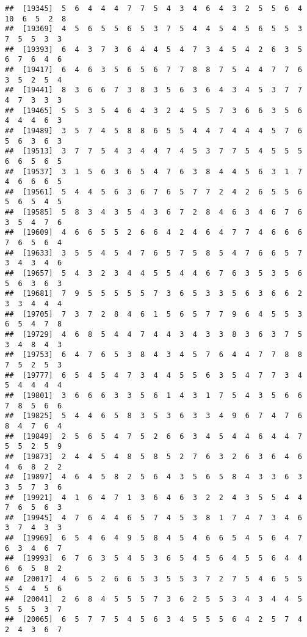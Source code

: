 \documentclass[
]{book}
\begin{document}
\begin{verbatim}
##  [19345]  5  6  4  4  4  7  7  5  4  3  4  6  4  3  2  5  5  6  4 10  6  5  2  8
##  [19369]  4  5  6  5  5  6  5  3  7  5  4  4  5  4  5  6  5  5  3  7  5  5  3  3
##  [19393]  6  4  3  7  3  6  4  4  5  4  7  3  4  5  4  2  6  3  5  6  7  6  4  6
##  [19417]  6  4  6  3  5  6  5  6  7  7  8  8  7  5  4  4  7  7  6  3  5  2  5  4
##  [19441]  8  3  6  6  7  3  8  3  5  6  3  6  4  3  4  5  3  7  7  4  7  3  3  3
##  [19465]  5  5  3  5  4  6  4  3  2  4  5  5  7  3  6  6  3  5  6  4  4  4  6  3
##  [19489]  3  5  7  4  5  8  8  6  5  5  4  4  7  4  4  4  5  7  6  5  6  3  6  3
##  [19513]  3  7  7  5  4  3  4  4  7  4  5  3  7  7  5  4  5  5  5  6  6  5  6  5
##  [19537]  3  1  5  6  3  6  5  4  7  6  3  8  4  4  5  6  3  1  7  4  6  6  6  5
##  [19561]  5  4  4  5  6  3  6  7  6  5  7  7  2  4  2  6  5  5  6  5  6  5  4  5
##  [19585]  5  8  3  4  3  5  4  3  6  7  2  8  4  6  3  4  6  7  6  3  5  4  7  6
##  [19609]  4  6  6  5  5  2  6  6  4  2  4  6  4  7  7  4  6  6  6  7  6  5  6  4
##  [19633]  3  5  5  4  5  4  7  6  5  7  5  8  5  4  7  6  6  5  7  3  4  3  4  6
##  [19657]  5  4  3  2  3  4  4  5  5  4  4  6  7  6  3  5  3  5  6  5  6  3  6  3
##  [19681]  7  9  5  5  5  5  5  7  3  6  5  3  3  5  6  3  6  6  2  3  3  4  4  4
##  [19705]  7  3  7  2  8  4  6  1  5  6  5  7  7  9  6  4  5  5  3  6  5  4  7  8
##  [19729]  4  6  8  5  4  4  7  4  4  3  4  3  3  8  3  6  3  7  5  3  4  8  4  3
##  [19753]  6  4  7  6  5  3  8  4  3  4  5  7  6  4  4  7  7  8  8  7  5  2  5  3
##  [19777]  6  5  4  5  4  7  3  4  4  5  5  6  3  5  4  7  7  3  4  5  4  4  4  4
##  [19801]  3  6  6  6  3  3  5  6  1  4  3  1  7  5  4  3  5  6  6  7  8  5  6  6
##  [19825]  5  4  4  6  5  8  3  5  3  6  3  3  4  9  6  7  4  7  6  8  4  7  6  4
##  [19849]  2  5  6  5  4  7  5  2  6  6  3  4  5  4  4  6  4  4  7  5  5  2  5  9
##  [19873]  2  4  4  5  4  8  5  8  5  2  7  6  3  2  6  3  6  4  6  4  6  8  2  2
##  [19897]  4  6  4  5  8  2  5  6  4  3  5  6  5  8  4  3  3  6  3  3  5  7  3  6
##  [19921]  4  1  6  4  7  1  3  6  4  6  3  2  2  4  3  5  5  4  4  7  6  5  6  3
##  [19945]  4  7  6  4  4  6  5  7  4  5  3  8  1  7  4  7  3  4  6  3  7  4  3  3
##  [19969]  6  5  4  6  4  9  5  8  4  5  4  6  6  5  4  5  6  4  7  6  3  4  6  7
##  [19993]  6  7  6  3  5  4  5  3  6  5  4  5  6  4  5  5  6  4  4  6  6  5  8  2
##  [20017]  4  6  5  2  6  6  5  3  5  5  3  7  2  7  5  4  6  5  5  5  4  4  5  6
##  [20041]  2  6  8  4  5  5  5  7  3  6  2  5  5  3  4  3  4  4  5  5  5  5  3  7
##  [20065]  6  5  7  7  5  4  5  6  3  4  5  5  5  6  4  2  5  7  4  2  4  3  6  7

\end{verbatim}
\end{document}
